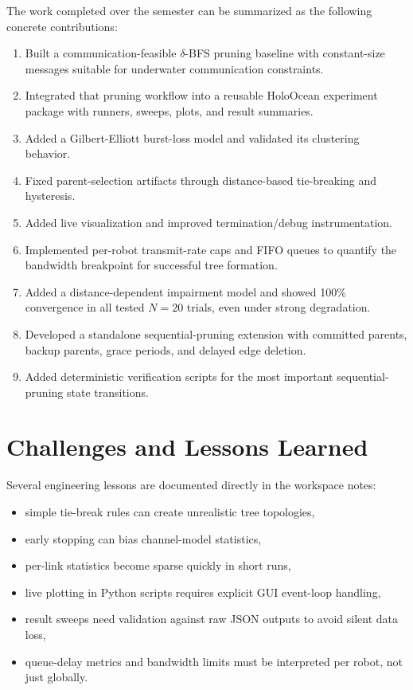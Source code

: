 \documentclass[11pt,a4paper]{article}
\begin{document}
The work completed over the semester can be summarized as the following concrete contributions:
\begin{enumerate}
  \item Built a communication-feasible \(\delta\)-BFS pruning baseline with constant-size messages suitable for underwater communication constraints.
  \item Integrated that pruning workflow into a reusable HoloOcean experiment package with runners, sweeps, plots, and result summaries.
  \item Added a Gilbert-Elliott burst-loss model and validated its clustering behavior.
  \item Fixed parent-selection artifacts through distance-based tie-breaking and hysteresis.
  \item Added live visualization and improved termination/debug instrumentation.
  \item Implemented per-robot transmit-rate caps and FIFO queues to quantify the bandwidth breakpoint for successful tree formation.
  \item Added a distance-dependent impairment model and showed 100\% convergence in all tested \(N = 20\) trials, even under strong degradation.
  \item Developed a standalone sequential-pruning extension with committed parents, backup parents, grace periods, and delayed edge deletion.
  \item Added deterministic verification scripts for the most important sequential-pruning state transitions.
\end{enumerate}

\section{Challenges and Lessons Learned}

Several engineering lessons are documented directly in the workspace notes:
\begin{itemize}
  \item simple tie-break rules can create unrealistic tree topologies,
  \item early stopping can bias channel-model statistics,
  \item per-link statistics become sparse quickly in short runs,
  \item live plotting in Python scripts requires explicit GUI event-loop handling,
  \item result sweeps need validation against raw JSON outputs to avoid silent data loss,
  \item queue-delay metrics and bandwidth limits must be interpreted per robot, not just globally.
\end{itemize}
\end{document}
